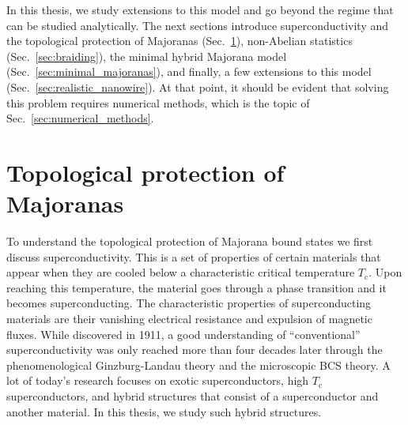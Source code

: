 In this thesis, we study extensions to this model and go beyond the regime that can be studied analytically.
The next sections introduce superconductivity and the topological protection of Majoranas (Sec.~\ref{sec:superconductivity}), non-Abelian statistics (Sec.~\ref{sec:braiding}), the minimal hybrid Majorana model (Sec.~\ref{sec:minimal_majoranas}), and finally, a few extensions to this model (Sec.~\ref{sec:realistic_nanowire}).
At that point, it should be evident that solving this problem requires numerical methods, which is the topic of Sec.~\ref{sec:numerical_methods}.




\section{Topological protection of Majoranas}\label{sec:superconductivity}
To understand the topological protection of Majorana bound states we first discuss superconductivity.
This is a set of properties of certain materials that appear when they are cooled below a characteristic critical temperature $T_{\mathrm{c}}$.
Upon reaching this temperature, the material goes through a phase transition and it becomes superconducting.
The characteristic properties of superconducting materials are their vanishing electrical resistance and expulsion of magnetic fluxes.
While discovered in 1911, a good understanding of ``conventional'' superconductivity was only reached more than four decades later through the phenomenological Ginzburg-Landau theory and the microscopic BCS theory.
A lot of today's research focuses on exotic superconductors, high $T_{\mathrm{c}}$ superconductors, and hybrid structures that consist of a superconductor and another material.
In this thesis, we study such hybrid structures.

